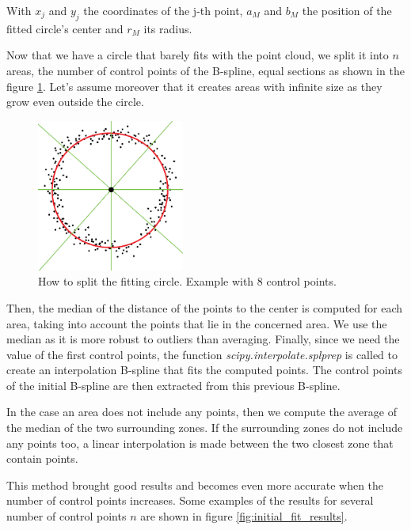 \documentclass{article}
\newcommand{\vsp}{\vspace{\baselineskip}}
\begin{document}
With $x_j$ and $y_j$ the coordinates of the j-th point, $a_M$ and $b_M$ the position of the fitted circle's center and $r_M$ its radius. 

\vsp

Now that we have a circle that barely fits with the point cloud, we split it into $n$ areas, the number of control points of the B-spline, equal sections as shown in the figure \ref{fig:split_circle}. Let's assume moreover that it creates areas with infinite size as they grow even outside the circle.

\begin{figure}[H]
    \centering
    \includegraphics[height = 5cm]{images/circle_split.png}
    \caption[How to split the fitting circle]{How to split the fitting circle. Example with 8 control points.}
    \label{fig:split_circle}
\end{figure}

Then, the median of the distance of the points to the center is computed for each area, taking into account the points that lie in the concerned area. We use the median as it is more robust to outliers than averaging. Finally, since we need the value of the first control points, the function \textit{scipy.interpolate.splprep} is called to create an interpolation B-spline that fits the computed points. The control points of the initial B-spline are then extracted from this previous B-spline.

\vsp

In the case an area does not include any points, then we compute the average of the median of the two surrounding zones. If the surrounding zones do not include any points too, a linear interpolation is made between the two closest zone that contain points. 

\vsp

This method brought good results and becomes even more accurate when the number of control points increases. Some examples of the results for several number of control points $n$ are shown in figure \ref{fig:initial_fit_results}. 
\end{document}

